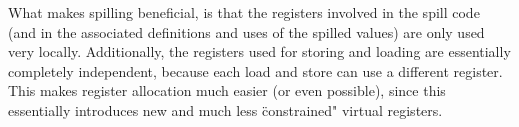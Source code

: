 What makes spilling beneficial, is that the registers involved in the spill code
(and in the associated definitions and uses of the spilled values) are only used
very locally. Additionally, the registers used for storing and loading are
essentially completely independent, because each load and store can use a
different register. This makes register allocation much easier
(or even possible), since this essentially introduces new and much less
\"constrained" virtual registers.







